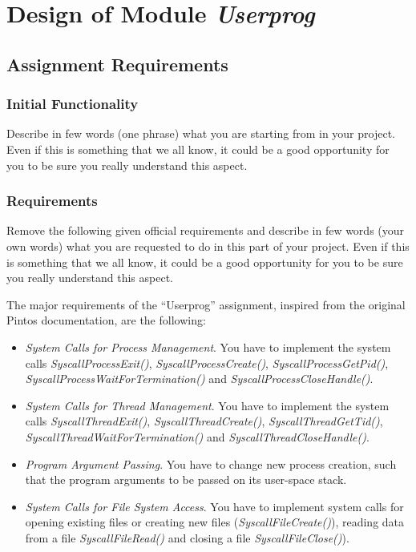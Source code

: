 
\chapter{Design of Module \textit{Userprog}}

\section{Assignment Requirements}

\subsection{Initial Functionality}

Describe in few words (one phrase) what you are starting from in your project. Even if this is something that we all know, it could be a good opportunity for you to be sure you really understand this aspect.

\subsection{Requirements}

Remove the following given official requirements and describe in few words (your own words) what you are requested to do in this part of your project. Even if this is something that we all know, it could be a good opportunity for you to be sure you really understand this aspect. 


The major requirements of the ``Userprog'' assignment, inspired from the original Pintos documentation, are the following:
\begin{itemize}
    \item \textit{System Calls for Process Management}. You have to implement the system calls \textit{SyscallProcessExit()}, \textit{SyscallProcessCreate()}, \textit{SyscallProcessGetPid()}, \textit{SyscallProcessWaitForTermination()} and \textit{SyscallProcessCloseHandle()}.

    \item \textit{System Calls for Thread Management}. You have to implement the system calls \textit{SyscallThreadExit()}, \textit{SyscallThreadCreate()}, \textit{SyscallThreadGetTid()}, \textit{SyscallThreadWaitForTermination()} and \textit{SyscallThreadCloseHandle()}.

    \item \textit{Program Argument Passing}. You have to change new process creation, such that the program arguments to be passed on its user-space stack.
    
    \item \textit{System Calls for File System Access}. You have to implement system calls for opening existing files or creating new files (\textit{SyscallFileCreate()}), reading data from a file \textit{SyscallFileRead()} and closing a file \textit{SyscallFileClose()}).
\end{itemize}


